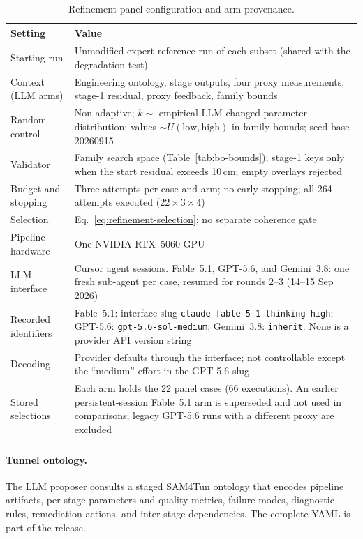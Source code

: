 \documentclass[a4paper,fleqn]{cas-dc}
\begin{document}
\begin{table}[t]
\caption{Refinement-panel configuration and arm provenance.}
\label{tab:poc-config}
\centering
\small
\begin{tabular*}{\textwidth}{@{\extracolsep{\fill}} Y{0.20\textwidth} Y{0.74\textwidth}}
\toprule
Setting & Value \\
\midrule
Starting run & Unmodified expert reference run of each subset (shared with the degradation test) \\
Context (LLM arms) & Engineering ontology, stage outputs, four proxy measurements, stage-1 residual, proxy feedback, family bounds \\
Random control & Non-adaptive; $k\sim$ empirical LLM changed-parameter distribution; values $\sim U(\mathrm{low},\mathrm{high})$ in family bounds; seed base 20260915 \\
Validator & Family search space (Table~\ref{tab:bo-bounds}); stage-1 keys only when the start residual exceeds 10\,cm; empty overlays rejected \\
Budget and stopping & Three attempts per case and arm; no early stopping; all 264 attempts executed ($22\times3\times4$) \\
Selection & Eq.~\eqref{eq:refinement-selection}; no separate coherence gate \\
Pipeline hardware & One NVIDIA RTX~5060 GPU \\
\midrule
LLM interface & Cursor agent sessions. Fable~5.1, GPT-5.6, and Gemini~3.8: one fresh sub-agent per case, resumed for rounds 2--3 (14--15 Sep 2026) \\
Recorded identifiers & Fable~5.1: interface slug \texttt{claude-fable-5-1-thinking-high}; GPT-5.6: \texttt{gpt-5.6-sol-medium}; Gemini~3.8: \texttt{inherit}. None is a provider API version string \\
Decoding & Provider defaults through the interface; not controllable except the ``medium'' effort in the GPT-5.6 slug \\
Stored selections & Each arm holds the 22 panel cases (66 executions). An earlier persistent-session Fable~5.1 arm is superseded and not used in comparisons; legacy GPT-5.6 runs with a different proxy are excluded \\
\bottomrule
\end{tabular*}
\end{table}

\paragraph{Tunnel ontology.}
The LLM proposer consults a staged SAM4Tun ontology that encodes pipeline artifacts, per-stage parameters and quality metrics, failure modes, diagnostic rules, remediation actions, and inter-stage dependencies. The complete YAML is part of the release.
\end{document}
